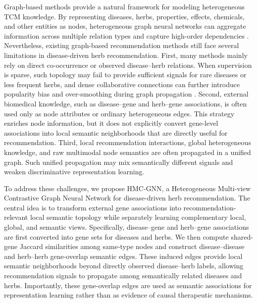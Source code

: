 \documentclass[journal,twoside,web]{ieeecolor}
\begin{document}
Graph-based methods provide a natural framework for modeling heterogeneous TCM knowledge. By representing diseases, herbs, properties, effects, chemicals, and other entities as nodes, heterogeneous graph neural networks can aggregate information across multiple relation types and capture high-order dependencies \cite{ref35,ref36,ref11,ref38,ref39,ref40,ref41}. Nevertheless, existing graph-based recommendation methods still face several limitations in disease-driven herb recommendation. First, many methods mainly rely on direct co-occurrence or observed disease--herb relations. When supervision is sparse, such topology may fail to provide sufficient signals for rare diseases or less frequent herbs, and dense collaborative connections can further introduce popularity bias and over-smoothing during graph propagation \cite{ref42,ref43,ref44}. Second, external biomedical knowledge, such as disease--gene and herb--gene associations, is often used only as node attributes or ordinary heterogeneous edges. This strategy enriches node information, but it does not explicitly convert gene-level associations into local semantic neighborhoods that are directly useful for recommendation. Third, local recommendation interactions, global heterogeneous knowledge, and raw multimodal node semantics are often propagated in a unified graph. Such unified propagation may mix semantically different signals and weaken discriminative representation learning.

To address these challenges, we propose HMC-GNN, a Heterogeneous Multi-view Contrastive Graph Neural Network for disease-driven herb recommendation. The central idea is to transform external gene associations into recommendation-relevant local semantic topology while separately learning complementary local, global, and semantic views. Specifically, disease--gene and herb--gene associations are first converted into gene sets for diseases and herbs. We then compute shared-gene Jaccard similarities among same-type nodes and construct disease--disease and herb--herb gene-overlap semantic edges. These induced edges provide local semantic neighborhoods beyond directly observed disease--herb labels, allowing recommendation signals to propagate among semantically related diseases and herbs. Importantly, these gene-overlap edges are used as semantic associations for representation learning rather than as evidence of causal therapeutic mechanisms.
\end{document}
